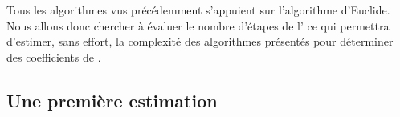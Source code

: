 Tous les algorithmes vus précédemment s'appuient sur l'algorithme d'Euclide. Nous allons donc chercher à évaluer le nombre d'étapes de l'\algoeucl{} ce qui permettra d'estimer, sans effort, la complexité des algorithmes présentés pour déterminer des coefficients de \bb.



\subsection{Une première estimation}






